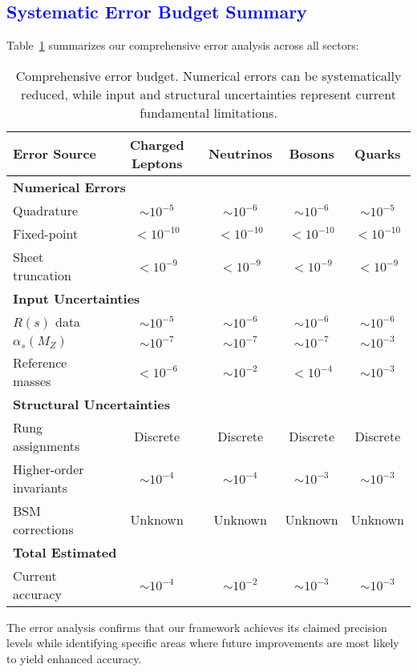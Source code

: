 \documentclass[%
amsmath,amssymb,
aps,
prb,
floatfix, showkeys, 10pt,
]{revtex4-2}
\newcommand{\modif}[1]{\textcolor{blue}{#1}}
\begin{document}
{\modif{ \subsection{Systematic Error Budget Summary}  }}
Table~\ref{tab:error_budget} summarizes our comprehensive error analysis across all sectors:
\begin{table}[ht]
\centering
\caption{Comprehensive error budget. Numerical errors can be systematically reduced, while input and structural uncertainties represent current fundamental limitations.}
\label{tab:error_budget}
\begin{tabular}{lcccc}
\hline\hline
Error Source & Charged Leptons & Neutrinos & Bosons & Quarks \\
\hline
\multicolumn{5}{l}{\textbf{Numerical Errors}} \\
Quadrature & $\sim 10^{-5}$ & $\sim 10^{-6}$ & $\sim 10^{-6}$ & $\sim 10^{-5}$ \\
Fixed-point & $< 10^{-10}$ & $< 10^{-10}$ & $< 10^{-10}$ & $< 10^{-10}$ \\
Sheet truncation & $< 10^{-9}$ & $< 10^{-9}$ & $< 10^{-9}$ & $< 10^{-9}$ \\
\hline
\multicolumn{5}{l}{\textbf{Input Uncertainties}} \\
$R(s)$ data & $\sim 10^{-5}$ & $\sim 10^{-6}$ & $\sim 10^{-6}$ & $\sim 10^{-6}$ \\
$\alpha_s(M_Z)$ & $\sim 10^{-7}$ & $\sim 10^{-7}$ & $\sim 10^{-7}$ & $\sim 10^{-3}$ \\
Reference masses & $< 10^{-6}$ & $\sim 10^{-2}$ & $< 10^{-4}$ & $\sim 10^{-3}$ \\
\hline
\multicolumn{5}{l}{\textbf{Structural Uncertainties}} \\
Rung assignments & Discrete & Discrete & Discrete & Discrete \\
Higher-order invariants & $\sim 10^{-4}$ & $\sim 10^{-4}$ & $\sim 10^{-3}$ & $\sim 10^{-3}$ \\
BSM corrections & Unknown & Unknown & Unknown & Unknown \\
\hline
\multicolumn{5}{l}{\textbf{Total Estimated}} \\
Current accuracy & $\sim 10^{-4}$ & $\sim 10^{-2}$ & $\sim 10^{-3}$ & $\sim 10^{-3}$ \\
\hline\hline
\end{tabular}
\end{table}

The error analysis confirms that our framework achieves its claimed precision levels while identifying specific areas where future improvements are most likely to yield enhanced accuracy.
\end{document}
